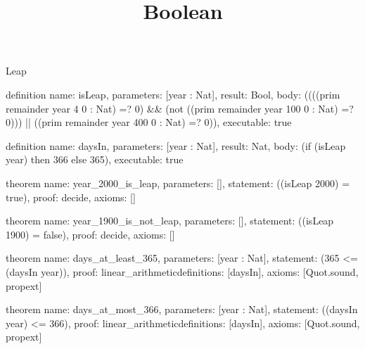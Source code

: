 \begin{lexlean}{Leap}
\title{Boolean}
\begin{semanticmodule}
definition{
  name: isLeap,
  parameters: [year : Nat],
  result: Bool,
  body: ((((prim remainder year 4 0 : Nat) =? 0) && (not ((prim remainder year 100 0 : Nat) =? 0))) || ((prim remainder year 400 0 : Nat) =? 0)),
  executable: true
}

definition{
  name: daysIn,
  parameters: [year : Nat],
  result: Nat,
  body: (if (isLeap year) then 366 else 365),
  executable: true
}

theorem{
  name: year_2000_is_leap,
  parameters: [],
  statement: ((isLeap 2000) = true),
  proof: decide{},
  axioms: []
}

theorem{
  name: year_1900_is_not_leap,
  parameters: [],
  statement: ((isLeap 1900) = false),
  proof: decide{},
  axioms: []
}

theorem{
  name: days_at_least_365,
  parameters: [year : Nat],
  statement: (365 <= (daysIn year)),
  proof: linear_arithmetic{definitions: [daysIn]},
  axioms: [Quot.sound, propext]
}

theorem{
  name: days_at_most_366,
  parameters: [year : Nat],
  statement: ((daysIn year) <= 366),
  proof: linear_arithmetic{definitions: [daysIn]},
  axioms: [Quot.sound, propext]
}
\end{semanticmodule}
\end{lexlean}
